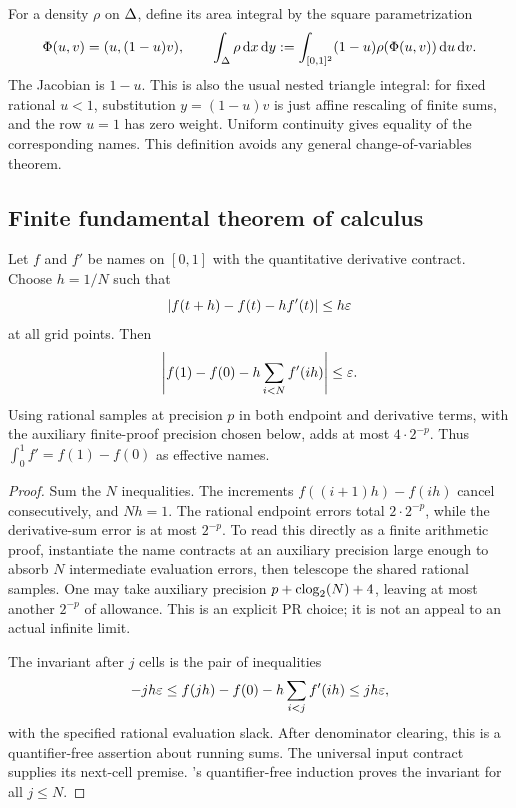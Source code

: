 For a density $\rho$ on $\Delta$, define its area integral by the square parametrization
\begin{equation}\label{eq:Phi}
\Phi(u,v)=(u,(1-u)v),\qquad
\int_\Delta\rho\,\mathrm d x\,\mathrm d y:=
\int_{[0,1]^2}(1-u)\rho(\Phi(u,v))\,\mathrm d u\,\mathrm d v.
\end{equation}
The Jacobian is $1-u$. This is also the usual nested triangle integral: for fixed rational $u<1$, substitution $y=(1-u)v$ is just affine rescaling of finite sums, and the row $u=1$ has zero weight. Uniform continuity gives equality of the corresponding names. This definition avoids any general change-of-variables theorem.

\subsection{Finite fundamental theorem of calculus}

\begin{lemma}\label{lem:ftc}
Let $f$ and $f'$ be names on $[0,1]$ with the quantitative derivative contract. Choose $h=1/N$ such that
\[
\left|f(t+h)-f(t)-hf'(t)\right|\le h\varepsilon
\]
at all grid points. Then
\begin{equation}\label{eq:finiteFTC}
\left|f(1)-f(0)-h\sum_{i<N}f'(ih)\right|\le\varepsilon.
\end{equation}
Using rational samples at precision $p$ in both endpoint and derivative terms, with the auxiliary finite-proof precision chosen below, adds at most $4\cdot2^{-p}$. Thus $\int_0^1 f'=f(1)-f(0)$ as effective names.
\end{lemma}
\begin{proof}
Sum the $N$ inequalities. The increments $f((i+1)h)-f(ih)$ cancel consecutively, and $Nh=1$. The rational endpoint errors total $2\cdot2^{-p}$, while the derivative-sum error is at most $2^{-p}$. To read this directly as a finite arithmetic proof, instantiate the name contracts at an auxiliary precision large enough to absorb $N$ intermediate evaluation errors, then telescope the shared rational samples. One may take auxiliary precision $p+\operatorname{clog}_2(N)+4$, leaving at most another $2^{-p}$ of allowance. This is an explicit PR choice; it is not an appeal to an actual infinite limit.

The invariant after $j$ cells is the pair of inequalities
\[
-jh\varepsilon\le f(jh)-f(0)-h\sum_{i<j}f'(ih)\le jh\varepsilon,
\]
with the specified rational evaluation slack. After denominator clearing, this is a quantifier-free assertion about running sums. The universal input contract supplies its next-cell premise. \ipra's quantifier-free induction proves the invariant for all $j\le N$.
\end{proof}

